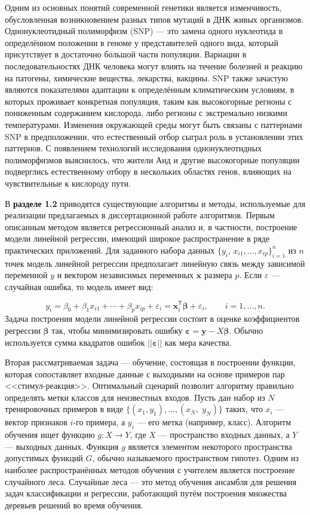 Одним из основных понятий современной генетики является изменчивость, обусловленная возникновением разных типов мутаций в ДНК живых организмов. Однонуклеотидный полиморфизм (SNP) --- это замена одного нуклеотида в определённом положении в геноме у представителей одного вида, который присутствует в достаточно большой части популяции. Вариации в последовательностях ДНК человека могут влиять на течение болезней и реакцию на патогены, химические вещества, лекарства, вакцины. SNP также зачастую являются показателями адаптации к определённым климатическим условиям, в которых проживает конкретная популяция, таким как высокогорные регионы с пониженным содержанием кислорода, либо регионы с экстремально низкими температурами. Изменения окружающей среды могут быть связаны с паттернами SNP в предположении, что естественный отбор сыграл роль в установлении этих паттернов. С появлением технологий исследования однонуклеотидных полиморфизмов выяснилось, что жители Анд и другие высокогорные популяции подверглись естественному отбору в нескольких областях генов, влияющих на чувствительные к кислороду пути. 

В \textbf{разделе 1.2} приводятся существующие алгоритмы и методы, используемые для реализации предлагаемых в диссертационной работе алгоритмов. Первым описанным методом является регрессионный анализ и, в частности, построение модели линейной регрессии, имеющий широкое распространение в ряде практических приложений. Для заданного набора данных $\{y_{i},\,x_{i1},\ldots,x_{ip}\}_{i=1}^{n}$ из $n$ точек модель линейной регрессии предполагает линейную связь между зависимой переменной $y$ и вектором независимых переменных $\textbf{x}$ размера $p$. Если $\varepsilon$ --- случайная ошибка, то модель имеет вид:

\[
y_{i}=\beta_{0} + \beta_{1} x_{i1} + \cdots + \beta_{p} x_{ip} + \varepsilon_{i} = \mathbf{x}_{i}^{\mathsf{T}}{\boldsymbol{\beta}} + \varepsilon_{i}, \qquad i = 1, \ldots, n.
\]
Задача построения модели линейной регрессии состоит в оценке коэффициентов регрессии ${\boldsymbol{\beta}}$ так, чтобы минимизировать ошибку ${\boldsymbol{\varepsilon}} = \mathbf{y} - X{\boldsymbol{\beta}}$. Обычно используется сумма квадратов ошибок $||{\boldsymbol{\varepsilon}}||$ как мера качества. 

Вторая рассматриваемая задача --- обучение, состоящая в построении функции, которая сопоставляет входные данные с выходными на основе примеров пар <<стимул-реакция>>. Оптимальный сценарий позволит алгоритму правильно определять метки классов для неизвестных входов. Пусть дан набор из $N$ тренировочных примеров в виде $\{(x_1, y_1), ..., (x_N,\; y_N)\}$ таких, что $x_{i}$ --- вектор признаков $i$-го примера, а $y_{i}$ --- его метка (например, класс). Алгоритм обучения ищет функцию $g: X \to Y$, где $X$ --- пространство входных данных, а $Y$ --- выходных данных. Функция $g$ является элементом некоторого пространства допустимых функций $G$, обычно называемого пространством гипотез. Одним из наиболее распространённых методов обучения с учителем является построение случайного леса. Случайные леса --- это метод обучения ансамбля для решения задач классификации и регрессии, работающий путём построения множества деревьев решений во время обучения. 

